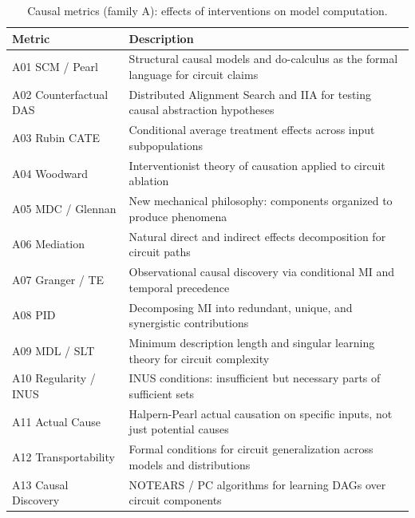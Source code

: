 \documentclass[10pt]{article}
\begin{document}
\begin{table}[H]
\centering
\small
\caption{Causal metrics (family A): effects of interventions on model computation.}
\label{tab:causal_metrics}
\renewcommand{\arraystretch}{1.15}
\begin{tabular}{@{}l>{\raggedright\arraybackslash}p{9.5cm}@{}}
\toprule
\textbf{Metric} & \textbf{Description} \\
\midrule
A01 SCM / Pearl & Structural causal models and do-calculus as the formal language for circuit claims \\
\midrule
A02 Counterfactual DAS & Distributed Alignment Search and IIA for testing causal abstraction hypotheses \\
\midrule
A03 Rubin CATE & Conditional average treatment effects across input subpopulations \\
\midrule
A04 Woodward & Interventionist theory of causation applied to circuit ablation \\
\midrule
A05 MDC / Glennan & New mechanical philosophy: components organized to produce phenomena \\
\midrule
A06 Mediation & Natural direct and indirect effects decomposition for circuit paths \\
\midrule
A07 Granger / TE & Observational causal discovery via conditional MI and temporal precedence \\
\midrule
A08 PID & Decomposing MI into redundant, unique, and synergistic contributions \\
\midrule
A09 MDL / SLT & Minimum description length and singular learning theory for circuit complexity \\
\midrule
A10 Regularity / INUS & INUS conditions: insufficient but necessary parts of sufficient sets \\
\midrule
A11 Actual Cause & Halpern-Pearl actual causation on specific inputs, not just potential causes \\
\midrule
A12 Transportability & Formal conditions for circuit generalization across models and distributions \\
\midrule
A13 Causal Discovery & NOTEARS / PC algorithms for learning DAGs over circuit components \\
\bottomrule
\end{tabular}
\end{table}
\end{document}
